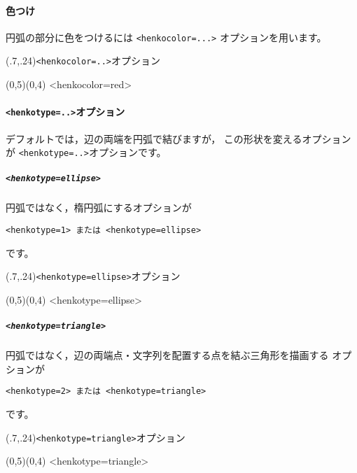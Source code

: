 \paragraph{色つけ}
円弧の部分に色をつけるには \verb+<henkocolor=...>+ オプションを用います。

\begin{showEx}(.7,.24){\texttt{<henkocolor=..>}オプション}
\begin{zahyou*}[ul=6mm](0,5)(0,4)
  \Hasen{\A\B}
  \HenKo<henkocolor=red>\A{}
\end{zahyou*}
\end{showEx}

\paragraph{\texttt{<henkotype=..>}オプション}
デフォルトでは，辺の両端を円弧で結びますが，
この形状を変えるオプションが \verb+<henkotype=..>+オプションです。

\subparagraph{\texttt{<henkotype=ellipse>}}
円弧ではなく，楕円弧にするオプションが
\begin{jquote}
\begin{verbatim}
<henkotype=1> または <henkotype=ellipse>
\end{verbatim}
\end{jquote}
です。

\begin{showEx}(.7,.24){\texttt{<henkotype=ellipse>}オプション}
\begin{zahyou*}[ul=6mm](0,5)(0,4)
  \Hasen{\A\B}
  \HenKo<henkotype=ellipse>\A{}
\end{zahyou*}
\end{showEx}

\subparagraph{\texttt{<henkotype=triangle>}}
円弧ではなく，辺の両端点・文字列を配置する点を結ぶ三角形を描画する
オプションが
\begin{jquote}
\begin{verbatim}
<henkotype=2> または <henkotype=triangle>
\end{verbatim}
\end{jquote}
です。

\begin{showEx}(.7,.24){\texttt{<henkotype=triangle>}オプション}
\begin{zahyou*}[ul=6mm](0,5)(0,4)
  \Hasen{\A\B}
  \HenKo<henkotype=triangle>\A{}
\end{zahyou*}
\end{showEx}

